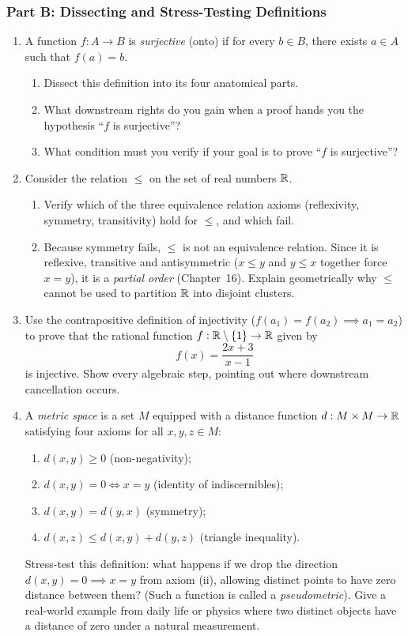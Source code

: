 \subsubsection*{Part B: Dissecting and Stress-Testing Definitions}
\begin{enumerate}[resume]
\item A function $f: A \to B$ is \emph{surjective} (onto) if for every $b \in B$, there exists $a \in A$ such that $f(a) = b$.
\begin{enumerate}[label=(\alph*)]
\item Dissect this definition into its four anatomical parts.
\item What downstream rights do you gain when a proof hands you the hypothesis ``$f$ is surjective''?
\item What condition must you verify if your goal is to prove ``$f$ is surjective''?
\end{enumerate}

\item Consider the relation $\le$ on the set of real numbers $\mathbb{R}$.
\begin{enumerate}[label=(\alph*)]
\item Verify which of the three equivalence relation axioms (reflexivity, symmetry, transitivity) hold for $\le$, and which fail.
\item Because symmetry fails, $\le$ is not an equivalence relation. Since it is reflexive, transitive and antisymmetric ($x \le y$ and $y \le x$ together force $x = y$), it is a \emph{partial order} (Chapter~16). Explain geometrically why $\le$ cannot be used to partition $\mathbb{R}$ into disjoint clusters.
\end{enumerate}

\item Use the contrapositive definition of injectivity ($f(a_1) = f(a_2) \implies a_1 = a_2$) to prove that the rational function $f: \mathbb{R} \setminus \{1\} \to \mathbb{R}$ given by
\[
f(x) = \frac{2x + 3}{x - 1}
\]
is injective. Show every algebraic step, pointing out where downstream cancellation occurs.

\item A \emph{metric space} is a set $M$ equipped with a distance function $d: M \times M \to \mathbb{R}$ satisfying four axioms for all $x, y, z \in M$:
\begin{enumerate}[label=(\roman*)]
\item $d(x, y) \ge 0$ (non-negativity);
\item $d(x, y) = 0 \iff x = y$ (identity of indiscernibles);
\item $d(x, y) = d(y, x)$ (symmetry);
\item $d(x, z) \le d(x, y) + d(y, z)$ (triangle inequality).
\end{enumerate}
Stress-test this definition: what happens if we drop the direction $d(x, y) = 0 \implies x = y$ from axiom (ii), allowing distinct points to have zero distance between them? (Such a function is called a \emph{pseudometric}). Give a real-world example from daily life or physics where two distinct objects have a distance of zero under a natural measurement.
\end{enumerate}

